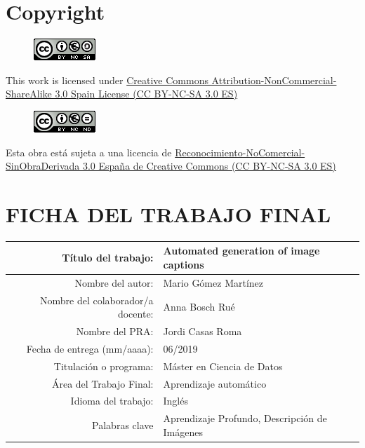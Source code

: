 \setcounter{page}{1} 
\pagestyle{plain}

\chapter*{Copyright}

\vspace{1cm}

\begin{figure}[ht]
    \centering
	\includegraphics[scale=1]{images/license.png}
\end{figure}

This work is licensed under \href{https://creativecommons.org/licenses/by-nc-sa/3.0/es/deed.en}{Creative Commons Attribution-NonCommercial-ShareAlike 3.0 Spain License (CC BY-NC-SA 3.0 ES)} 

\vspace{1cm}

\begin{figure}[ht]
    \centering
	\includegraphics[scale=1]{images/licencia.png}
\end{figure}

Esta obra está sujeta a una licencia de \href{https://creativecommons.org/licenses/by-nc-sa/3.0/es/}{Reconocimiento-NoComercial-SinObraDerivada 3.0 España de Creative Commons (CC BY-NC-SA 3.0 ES)}


\chapter*{FICHA DEL TRABAJO FINAL}

\begin{table}[ht]
	\centering{}
	\renewcommand{\arraystretch}{2}
	\begin{tabular}{r | l}
		\hline
		Título del trabajo: & Automated generation of image captions\\
		\hline
        Nombre del autor: & Mario Gómez Martínez\\
		\hline
        Nombre del colaborador/a docente: & Anna Bosch Rué\\
		\hline
        Nombre del PRA: & Jordi Casas Roma\\
		\hline
        Fecha de entrega (mm/aaaa): & 06/2019\\
		\hline
        Titulación o programa: & Máster en Ciencia de Datos\\
		\hline
        Área del Trabajo Final: & Aprendizaje automático\\
		\hline
        Idioma del trabajo: & Inglés\\
		\hline
        Palabras clave & Aprendizaje Profundo, Descripción de Imágenes\\
		\hline
	\end{tabular}
\end{table}

